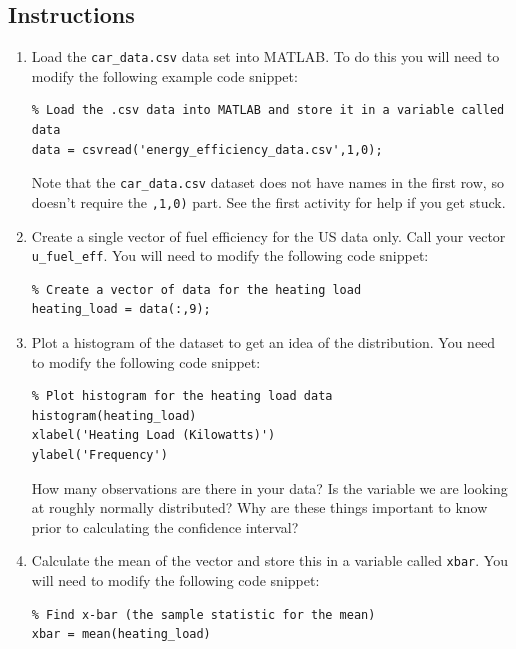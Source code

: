 \documentclass[12pt]{article}
\begin{document}
\subsection*{Instructions}
\begin{enumerate}
\item Load the \verb|car_data.csv| data set into MATLAB. To do this you will need to modify the following example code snippet:
\vspace{-0.4cm}
\begin{lstlisting}
% Load the .csv data into MATLAB and store it in a variable called data
data = csvread('energy_efficiency_data.csv',1,0);
\end{lstlisting}

Note that the \verb|car_data.csv| dataset does not have names in the first row, so doesn't require the \verb|,1,0)| part. See the first activity for help if you get stuck.

\item Create a single vector of fuel efficiency for the US data only. Call your vector \verb|u_fuel_eff|. You will need to modify the following code snippet:
\vspace{-0.4cm}
\begin{lstlisting}
% Create a vector of data for the heating load
heating_load = data(:,9);
\end{lstlisting}

\item Plot a histogram of the dataset to get an idea of the distribution. You need to modify the following code snippet:
\vspace{-0.4cm}
\begin{lstlisting}
% Plot histogram for the heating load data
histogram(heating_load)
xlabel('Heating Load (Kilowatts)')
ylabel('Frequency')
\end{lstlisting}

How many observations are there in your data? Is the variable we are looking at roughly normally distributed? Why are these things important to know prior to calculating the confidence interval?

\item Calculate the mean of the vector and store this in a variable called \verb|xbar|. You will need to modify the following code snippet:
\vspace{-0.4cm}
\begin{lstlisting}
% Find x-bar (the sample statistic for the mean)
xbar = mean(heating_load)
\end{lstlisting}


\end{enumerate}
\end{document}
